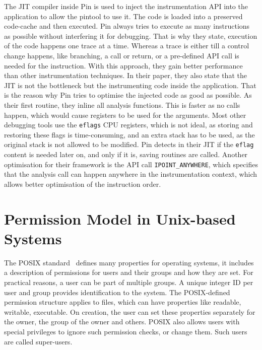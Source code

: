 The JIT compiler inside Pin is used to inject the instrumentation API into the
application to allow the pintool to use it. The code is loaded into a preserved
code-cache and then executed. Pin always tries to execute as many instructions
as possible without interfering it for debugging. That is why they state,
execution of the code happens one trace at a time. Whereas a trace is either
till a control change happens, like branching, a call or return, or a
pre-defined API call is needed for the instruction. With this approach, they
gain better performance than other instrumentation techniques. In their paper,
they also state that the JIT is not the bottleneck but the instrumenting code
inside the application. That is the reason why Pin tries to optimise the
injected code as good as possible. As their first routine, they inline all
analysis functions. This is faster as no calls happen, which would cause
registers to be used for the arguments. Most other debugging tools use the
\texttt{eflags} CPU registers, which is not ideal, as storing and restoring
these flags is time-consuming, and an extra stack has to be used, as the
original stack is not allowed to be modified. Pin detects in their JIT if the
\texttt{eflag} content is needed later on, and only if it is, saving routines
are called. Another optimisation for their framework is the API call
\texttt{IPOINT\_ANYWHERE}, which specifies that the analysis call can happen
anywhere in the instrumentation context, which allows better optimisation of the
instruction order.

\section{Permission Model in Unix-based Systems}

The POSIX standard~\cite{posix} defines many properties for operating systems,
it includes a description of permissions for users and their groups and how
they are set. For practical reasons, a user can be part of multiple groups. A
unique integer ID per user and group provides identification to the system. The
POSIX-defined permission structure applies to files, which can have properties
like readable, writable, executable. On creation, the user can set these
properties separately for the owner, the group of the owner and others. POSIX
also allows users with special privileges to ignore such permission checks, or
change them. Such users are called super-users.

